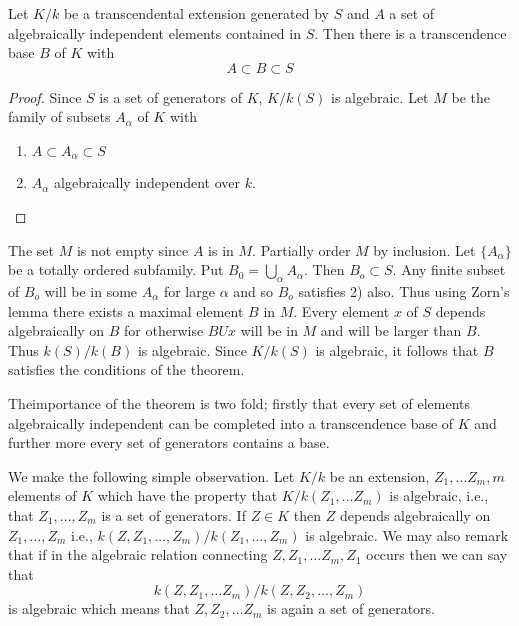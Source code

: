 \begin{thm}\label{c1:thm8}%
Let $ K/k $ be a transcendental extension generated by $S$ and
   $A$  a set of algebraically independent elements contained in
   $S$. Then there is a transcendence base $B$ of $K$  with  
 $$
 A  \subset B \subset S
 $$
\end{thm}

\begin{proof}
 Since $S$ is a set of generators of $K$, $ K/k  (S ) $ is
 algebraic. Let $M$  be the family of subsets $ A_\alpha$  of $K$
 with  
 \begin{enumerate}[1)]
\item $A \subset  A_\alpha \subset S$
\item $A_\alpha$ algebraically independent over $k$.
\end{enumerate} 
\end{proof}

The set $M$  is not empty since  $A$ is in  $M$. Partially order $M$
by inclusion. Let $ \{ A_\alpha \} $  be  a totally ordered
subfamily. Put $ B_0 = {\bigcup\limits_\alpha} A_\alpha $. Then $
B_o \subset S $. Any finite  subset of $ B_o $  will be in some
$A_\alpha $ for  large $ \alpha$  and so $ B_o $  satisfies  2)
also. Thus using  Zorn's lemma  there exists a maximal element $B$
in $M$. Every element $x$  of $S$  depends algebraically on $B$ for
otherwise  $ B U x $  will be in $M$  and  will be larger than
$B$. Thus $ k (S)/k (B) $ is  algebraic. Since $ K / k (S) $ is
algebraic, it follows that  $B$   satisfies the  conditions of the
theorem. 

The\pageoriginale importance  of the theorem is two fold; firstly that
every set of elements algebraically independent can be  completed into a
transcendence base of $K$  and further more every set of generators
contains  a base. 

 We make the following  simple observation. Let $K /k$  be  an
 extension, $Z_1, \ldots Z_m, m $  elements  of $K$  which have the
 property that $ K /k ( Z_1 , \ldots Z_m ) $  is algebraic, i.e.,
 that $ Z_1 , \ldots , Z_m $ is a set  of generators. If $Z \in K $
 then $Z$  depends algebraically on $ Z_1 , \ldots , Z_m $ i.e., 
$ k ( Z, Z_1, \ldots ,Z_m ) / k ( Z_1 , \ldots , Z_m ) $  is
 algebraic. We may also remark  that if in the  algebraic relation
 connecting $ Z, Z_1, \ldots Z_m, Z_1 $ occurs then we can say that  
 $$
 k ( Z, Z_1, \ldots Z_m ) /k ( Z, Z_2 , \ldots , Z_m ) 
 $$
 is algebraic which means that $ Z,Z_2, \ldots Z_m $  is again a set
 of generators. 
 
